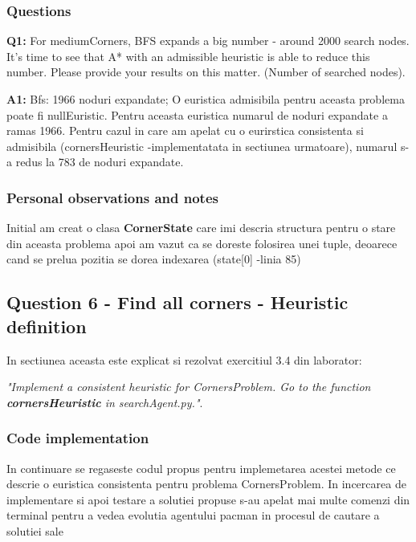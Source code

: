 \subsubsection{Questions}

\textbf{Q1:} For mediumCorners, BFS expands a big number - around 2000 search nodes.  It’s time to see that A* with an admissible heuristic is able to reduce this number. Please provide your results on this matter. (Number of searched nodes).

\textbf{A1:} Bfs: 1966 noduri expandate; O euristica admisibila pentru aceasta problema poate fi nullEuristic. Pentru aceasta euristica numarul de noduri expandate a ramas 1966. Pentru cazul in care am apelat cu o eurirstica consistenta si admisibila (cornersHeuristic -implementatata in sectiunea urmatoare), numarul s-a redus la 783 de noduri expandate.


\subsubsection{Personal observations and notes}
Initial am creat o clasa \textbf{CornerState} care imi descria structura pentru o stare din aceasta problema apoi am vazut ca se doreste folosirea unei tuple, deoarece cand se prelua pozitia se dorea indexarea (state[0] -linia 85) 
\vspace{0.75cm}

\subsection{Question 6 - Find all corners - Heuristic definition}
In sectiunea aceasta este explicat si rezolvat exercitiul 3.4 din laborator:  \newline


\textit{"Implement  a  consistent  heuristic  for  CornersProblem. Go to the function \textbf{cornersHeuristic} in searchAgent.py."}.


\subsubsection{Code implementation}
 In continuare se regaseste codul propus pentru implemetarea acestei metode ce descrie o euristica consistenta pentru problema CornersProblem. In incercarea de implementare si apoi testare a solutiei propuse s-au apelat mai multe comenzi din terminal pentru a vedea evolutia agentului pacman in procesul de cautare a solutiei sale \newline\newline\\


